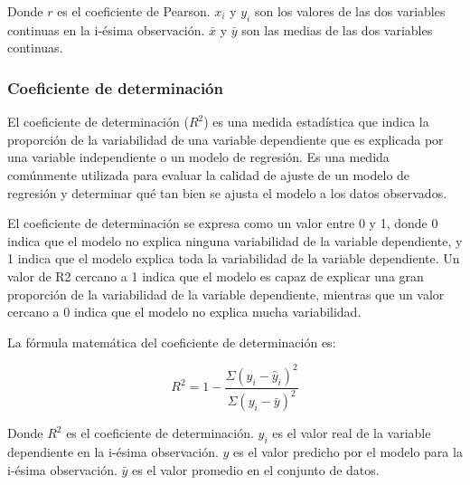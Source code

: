 Donde $r$ es el coeficiente de Pearson. $x_i$ y $y_i$ son los valores de las dos variables continuas en la i-ésima observación. $\bar{x}$ y $\bar{y}$ son las medias de las dos variables continuas.


\subsubsection{Coeficiente de determinación}
El coeficiente de determinación ($R^2$) es una medida estadística que indica la proporción de la variabilidad de una variable dependiente que es explicada por una variable independiente o un modelo de regresión. Es una medida comúnmente utilizada para evaluar la calidad de ajuste de un modelo de regresión y determinar qué tan bien se ajusta el modelo a los datos observados.

El coeficiente de determinación se expresa como un valor entre 0 y 1, donde 0 indica que el modelo no explica ninguna variabilidad de la variable dependiente, y 1 indica que el modelo explica toda la variabilidad de la variable dependiente. Un valor de R2 cercano a 1 indica que el modelo es capaz de explicar una gran proporción de la variabilidad de la variable dependiente, mientras que un valor cercano a 0 indica que el modelo no explica mucha variabilidad.

La fórmula matemática del coeficiente de determinación es:

$$R^2 = 1 - \frac{\Sigma(y_i - \hat{y}_i)^2}{\Sigma(y_i - \bar{y})^2}$$

Donde $R^2$ es el coeficiente de determinación. $y_i$ es el valor real de la variable dependiente en la i-ésima observación. $\hat{y}$ es el valor predicho por el modelo para la i-ésima observación. $\bar{y}$ es el valor promedio en el conjunto de datos.
